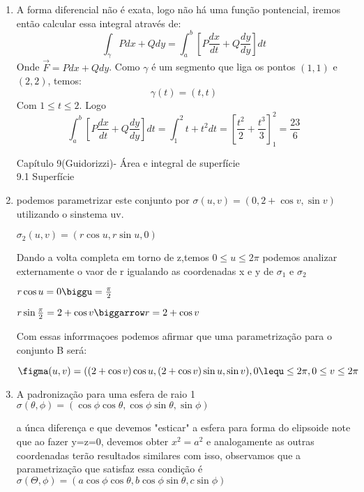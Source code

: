 \documentclass[11pt,a4paper]{article}
\begin{document}
\begin{enumerate}
\item A forma diferencial n\~{a}o \'{e} exata, logo n\~{a}o h\'{a} uma fun\c{c}\~{a}o pontencial, iremos ent\~{a}o calcular essa integral atrav\'{e}s de: $$ \int_\gamma P dx + Q dy = \int_a^b \left[P \frac{dx}{dt} + Q \frac{dy}{dy} \right] dt $$ Onde $ \vec{F} = P dx + Q dy $. Como $ \gamma $ \'{e} um segmento que liga os pontos $ (1,1) $ e $ (2,2) $, temos: $$ \gamma (t) = (t,t) $$ Com $ 1 \le t \le 2 $. Logo $$ \int_a^b \left[P \frac{dx}{dt} + Q \frac{dy}{dy} \right] dt = \int_1^2 t + t^2 dt = \left[\frac{t^2}{2} + \frac{t^3}{3} \right]_1^2 = \frac{23}{6} $$ 


	
	\begin{center}
	    \begin{large}
	        Capítulo 9(Guidorizzi)- Área e integral de superfície\\9.1 Superfície 
	    \end{large}
	\end{center}

	
	\item 
	
	podemos parametrizar este conjunto por $\sigma(u,v)=(0,2+\cos v,\sin v)$ utilizando o sinstema uv.
	
	$\sigma_2 (u,v)=(r\cos u, r\sin u,0)$\newline
	
	Dando a volta completa em torno de z,temos $0\leq u\leq 2\pi$ podemos analizar externamente o vaor de r igualando as coordenadas x e y de $\sigma_1$ e $\sigma_2$
	
	$r\cos{u}=0 \biggu=\frac{\pi}{2}$
	
	$r\sin{\frac{\pi}{2}}=2+\cos v \biggarrow r=2+\cos v$\newline
	
	Com essas inforrmaçoes podemos afirmar que uma parametrização para o conjunto B será:
	
	$\figma(u,v)=((2+\cos{v})\cos{u}, (2+\cos{v})\sin{u},\sin{v}), 0\lequ\leq 2\pi, 0\leq v\leq 2\pi$\newline
	
	
	\item A padronização para uma esfera de raio 1\newline
	$\sigma (\theta,\phi)=(\cos\phi \cos\theta, \cos\phi \sin \theta, \sin \phi)$\newline

	a únca diferença e que devemos "esticar" a esfera para forma do elipsoide note que ao fazer y=z=0, devemos obter $x^{2}=a^{2}$ e analogamente as outras coordenadas terão resultados similares com isso, observamos que a parametrização que satisfaz essa condição é \newline
	$\sigma(\Theta,\phi)=(a\cos\phi \cos\theta, b\cos\phi \sin\theta, c\sin\phi)$ \newline


\end{enumerate}
\end{document}
